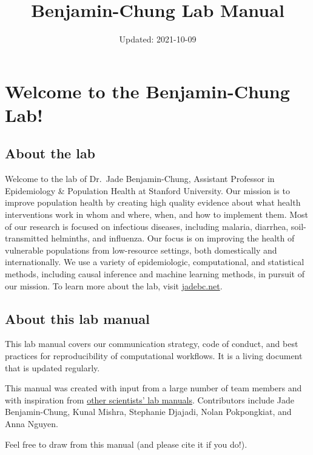 \documentclass[
]{book}
\title{Benjamin-Chung Lab Manual}
\author{}
\date{\vspace{-2.5em}Updated: 2021-10-09}
\begin{document}
\maketitle

{
\setcounter{tocdepth}{1}
\tableofcontents
}
\hypertarget{welcome-to-the-benjamin-chung-lab}{%
\chapter{Welcome to the Benjamin-Chung Lab!}\label{welcome-to-the-benjamin-chung-lab}}

\hypertarget{about-the-lab}{%
\section{About the lab}\label{about-the-lab}}

Welcome to the lab of Dr.~Jade Benjamin-Chung, Assistant Professor in Epidemiology \& Population Health at Stanford University. Our mission is to improve population health by creating high quality evidence about what health interventions work in whom and where, when, and how to implement them. Most of our research is focused on infectious diseases, including malaria, diarrhea, soil-transmitted helminths, and influenza. Our focus is on improving the health of vulnerable populations from low-resource settings, both domestically and internationally. We use a variety of epidemiologic, computational, and statistical methods, including causal inference and machine learning methods, in pursuit of our mission. To learn more about the lab, visit \href{https://jadebc.net}{jadebc.net}.

\hypertarget{about-this-lab-manual}{%
\section{About this lab manual}\label{about-this-lab-manual}}

This lab manual covers our communication strategy, code of conduct, and best practices for reproducibility of computational workflows. It is a living document that is updated regularly.

This manual was created with input from a large number of team members and with inspiration from \href{https://github.com/alylab/labmanual/blob/master/aly-lab-manual.pdf}{other scientists' lab manuals}.
Contributors include Jade Benjamin-Chung, Kunal Mishra, Stephanie Djajadi, Nolan Pokpongkiat, and Anna Nguyen.

Feel free to draw from this manual (and please cite it if you do!).
\end{document}
